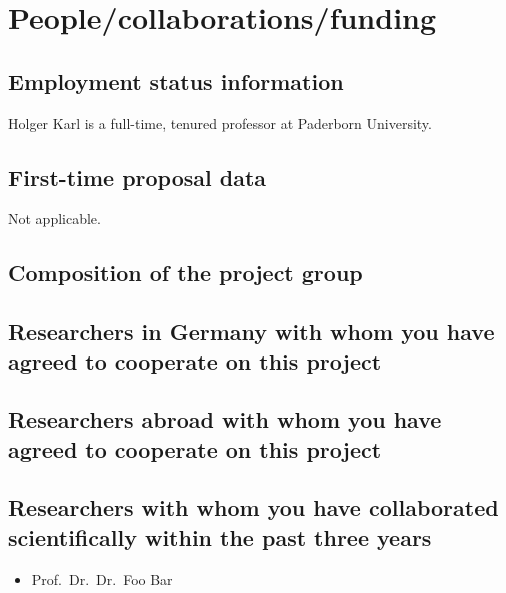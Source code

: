 \section{People/collaborations/funding}

\subsection{Employment status information}

Holger Karl is a full-time, tenured professor at Paderborn University. 

\subsection{First-time proposal data}

Not applicable. 

\subsection{Composition of the project group}




\subsection{Researchers in Germany with whom you have agreed to cooperate on this project}

\subsection{Researchers abroad with whom you have agreed to cooperate on this project}

\subsection{Researchers with whom you have collaborated scientifically within the past three years}
\begin{itemize}
  \item Prof.\ Dr.\ Dr.\ Foo Bar
\end{itemize}


